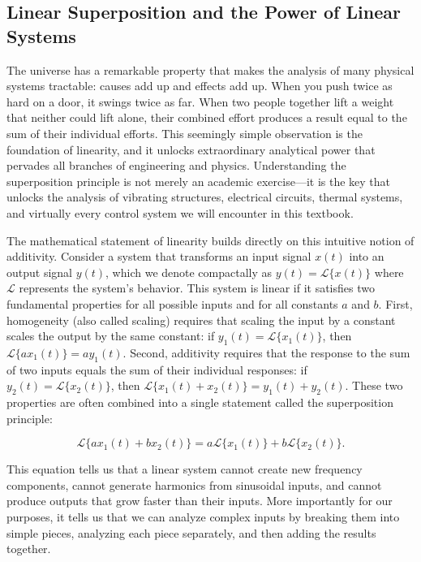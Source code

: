 \subsection{Linear Superposition and the Power of Linear Systems}

The universe has a remarkable property that makes the analysis of many physical systems tractable: causes add up and effects add up. When you push twice as hard on a door, it swings twice as far. When two people together lift a weight that neither could lift alone, their combined effort produces a result equal to the sum of their individual efforts. This seemingly simple observation is the foundation of linearity, and it unlocks extraordinary analytical power that pervades all branches of engineering and physics. Understanding the superposition principle is not merely an academic exercise—it is the key that unlocks the analysis of vibrating structures, electrical circuits, thermal systems, and virtually every control system we will encounter in this textbook.

The mathematical statement of linearity builds directly on this intuitive notion of additivity. Consider a system that transforms an input signal $x(t)$ into an output signal $y(t)$, which we denote compactally as $y(t) = \mathcal{L}\{x(t)\}$ where $\mathcal{L}$ represents the system's behavior. This system is linear if it satisfies two fundamental properties for all possible inputs and for all constants $a$ and $b$. First, homogeneity (also called scaling) requires that scaling the input by a constant scales the output by the same constant: if $y_1(t) = \mathcal{L}\{x_1(t)\}$, then $\mathcal{L}\{a x_1(t)\} = a y_1(t)$. Second, additivity requires that the response to the sum of two inputs equals the sum of their individual responses: if $y_2(t) = \mathcal{L}\{x_2(t)\}$, then $\mathcal{L}\{x_1(t) + x_2(t)\} = y_1(t) + y_2(t)$. These two properties are often combined into a single statement called the superposition principle:

\begin{equation}
\mathcal{L}\{a x_1(t) + b x_2(t)\} = a \mathcal{L}\{x_1(t)\} + b \mathcal{L}\{x_2(t)\}.
\end{equation}

This equation tells us that a linear system cannot create new frequency components, cannot generate harmonics from sinusoidal inputs, and cannot produce outputs that grow faster than their inputs. More importantly for our purposes, it tells us that we can analyze complex inputs by breaking them into simple pieces, analyzing each piece separately, and then adding the results together.

